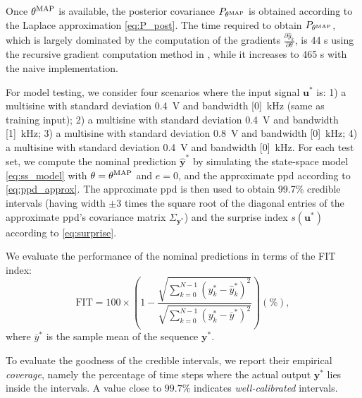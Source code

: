 \documentclass{article}
\newcommand{\nsamp}{N}
\newcommand{\MAP}{{\rm MAP}}
\newcommand{\tvec}[1]{{\mathbf{#1}}}
\newcommand{\mean}[1]{\hat{#1}}
\begin{document}
Once $\theta^\MAP$ is available, the posterior covariance $P_{\theta^\MAP}$ is obtained according to the Laplace approximation \eqref{eq:P_post}. The time required to obtain $P_{\theta^\MAP}$, which is largely dominated by the computation of the gradients $\frac{\partial \mean{y}_k}{\partial \theta}$, is  44 s using the recursive gradient computation method in \cite{forgione2022adaptation}, while it increases to 465 s with the naive implementation.

For model testing, we consider four  scenarios where the input signal $\tvec{u}^*$ is:
 1) a multisine with standard deviation 0.4~V and bandwidth [0]~kHz (same as training input);
 2) a multisine with standard deviation 0.4~V and bandwidth [1]~kHz;
 3) a multisine with standard deviation 0.8~V and bandwidth [0]~kHz;
 4) a multisine with standard deviation 0.4~V and bandwidth [0]~kHz.
 For each test set, we compute the nominal prediction $\mean{\tvec{y}}^*$ by simulating the state-space model \eqref{eq:ss_model} with $\theta=\theta^\MAP$ and  $e=0$, and the approximate ppd according to \eqref{eq:ppd_approx}. The approximate ppd is then used to obtain 99.7\% credible intervals (having width $\pm 3$ times the square root of the diagonal entries of the approximate ppd's covariance matrix $\Sigma_{\tvec{y}^*}$) and the surprise index $s(\tvec{u}^*)$ according to \eqref{eq:surprise}.

 
We evaluate the performance of the nominal predictions in terms of the FIT index:
\begin{equation}
\label{eq:fit_index}
\mathrm{FIT} = 100 \times \left(1- \frac{\sqrt{\sum_{k=0}^{\nsamp-1} \left({y}^*_k -  \mean{y}^*_k\right)^2} }  
{\sqrt{\sum_{k=0}^{\nsamp-1} \left({y}^*_k -  {\overline{y}^*}\right)^2}}\right) (\%),
\end{equation}
where ${\overline{y}^*}$ is the sample mean of the sequence $\tvec{y}^*$. %

To evaluate the goodness of the credible intervals, we report their empirical \emph{coverage}, namely the percentage 
of time steps where the actual output $\tvec{y}^*$ lies inside the intervals. A value close to $99.7\%$ indicates \emph{well-calibrated} intervals.
\end{document}
